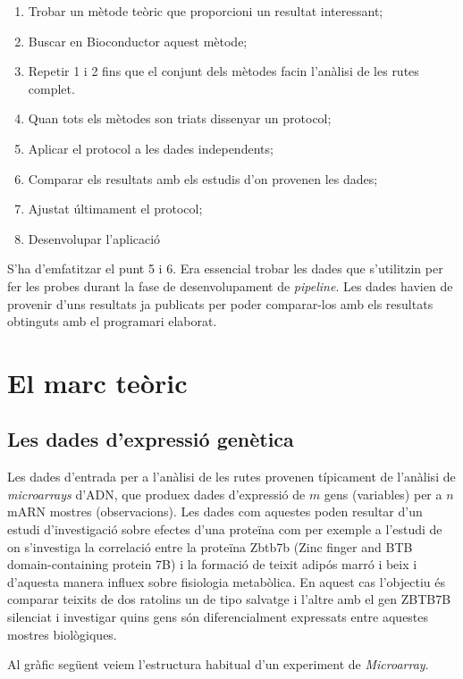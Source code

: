 \begin{enumerate}
\item Trobar un mètode teòric que proporcioni un resultat interessant;
\item Buscar en Bioconductor aquest mètode;
\item Repetir 1 i 2 fins que el conjunt dels mètodes facin l'anàlisi de les rutes complet. 
\item Quan tots els mètodes son triats dissenyar un protocol;
\item Aplicar el protocol a les dades independents;
\item Comparar els resultats amb els estudis d'on provenen les dades;
\item Ajustat últimament el protocol;
\item Desenvolupar l'aplicació
\end{enumerate}
 
S'ha d'emfatitzar el punt 5 i 6. Era essencial trobar les dades que s'utilitzin per fer les probes durant la fase de desenvolupament de \textit{pipeline}. Les dades havien de provenir d'uns resultats ja publicats per poder comparar-los amb els resultats obtinguts amb el programari elaborat. 



\chapter{El marc teòric}

\section{Les dades d'expressió genètica}
Les dades d'entrada per a l'anàlisi de les rutes provenen típicament de l'anàlisi de \textit{microarrays} d'ADN, que produex dades d'expressió de $m$ gens (variables) per a $n$ mARN mostres (observacions). Les dades com aquestes poden resultar d'un estudi d'investigació sobre efectes d'una proteïna com per exemple a l'estudi de \cite{li2017zbtb7b} on s'investiga la correlació entre la proteïna Zbtb7b (Zinc finger and BTB domain-containing protein 7B) i la formació de teixit adipós marró i beix i d'aquesta manera influex sobre fisiologia metabòlica. En aquest cas l'objectiu és comparar teixits de dos ratolins un de tipo salvatge i l'altre amb el gen ZBTB7B silenciat i investigar quins gens són diferencialment expressats entre aquestes mostres biològiques. 

Al gràfic següent veiem l'estructura habitual d'un experiment de \textit{Microarray}.

